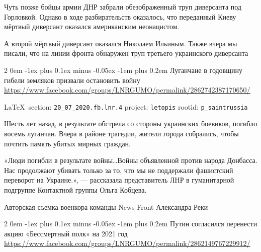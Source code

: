 \documentclass[a4paper,11pt]{extreport}
\makeatletter
\renewcommand\subsection{%
  \clearpage
    \@startsection{subsection}%
    {2}%
    {0em}%
    {-1ex plus 0.1ex minus -0.05ex}%
    {-1em plus 0.2em}%
    {\scshape\bfseries\Large}%
}
\makeatother
\begin{document}
Чуть позже бойцы армии ДНР забрали обезображенный труп диверсанта под
Горловкой.  Однако в ходе разбирательств оказалось, что переданный Киеву
мёртвый диверсант оказался американским неонацистом.

А второй мёртвый диверсант оказался Николаем Ильиным.  Также вчера мы писали,
что на линии фронта обнаружен труп третьего украинского диверсанта
  
 
 
\subsection{Луганчане в годовщину гибели земляков призвали остановить войну}
\label{sec:20_07_2020.fb.lnr.4}
\url{https://www.facebook.com/groups/LNRGUMO/permalink/2862742387170650/}
  
\vspace{0.5cm}
{\small\LaTeX~section: \verb|20_07_2020.fb.lnr.4| project: \verb|letopis| rootid: \verb|p_saintrussia|}
\vspace{0.5cm}
  
Шесть лет назад, в результате обстрела со стороны украинских боевиков, погибло
восемь луганчан. Вчера в районе трагедии, жители города собрались, чтобы
почтить память убитых мирных граждан.

«Люди погибли в результате войны\ldots Войны объявленной против народа Донбасса. Нас
продолжают убивать только за то, что мы не поддержали фашистский переворот на
Украине.», --- рассказала представитель ЛНР в гуманитарной подгруппе Контактной
группы Ольга Кобцева.

Авторская съемка военкора команды News Front Александра Реки
 
 

\subsection{Путин согласился перенести акцию «Бессмертный полк» на 2021 год}
\label{sec:20_07_2020.fb.lnr.5}
\url{https://www.facebook.com/groups/LNRGUMO/permalink/2862149767229912/}
  
\end{document}
